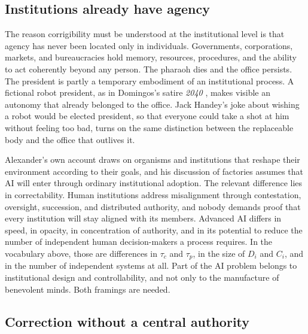 \documentclass[11pt]{article}
\begin{document}
\subsection{Institutions already have agency}

The reason corrigibility must be understood at the institutional level is that agency has never been located only in individuals. Governments, corporations, markets, and bureaucracies hold memory, resources, procedures, and the ability to act coherently beyond any person. The pharaoh dies and the office persists. The president is partly a temporary embodiment of an institutional process. A fictional robot president, as in Domingos's satire \emph{2040} \cite{domingos2024}, makes visible an autonomy that already belonged to the office. Jack Handey's joke about wishing a robot would be elected president, so that everyone could take a shot at him without feeling too bad, turns on the same distinction between the replaceable body and the office that outlives it.

Alexander's own account draws on organisms and institutions that reshape their environment according to their goals, and his discussion of factories assumes that AI will enter through ordinary institutional adoption. The relevant difference lies in correctability. Human institutions address misalignment through contestation, oversight, succession, and distributed authority, and nobody demands proof that every institution will stay aligned with its members. Advanced AI differs in speed, in opacity, in concentration of authority, and in its potential to reduce the number of independent human decision-makers a process requires. In the vocabulary above, those are differences in $\tau_c$ and $\tau_p$, in the size of $D_i$ and $C_i$, and in the number of independent systems at all. Part of the AI problem belongs to institutional design and controllability, and not only to the manufacture of benevolent minds. Both framings are needed.

\subsection{Correction without a central authority}
\end{document}
